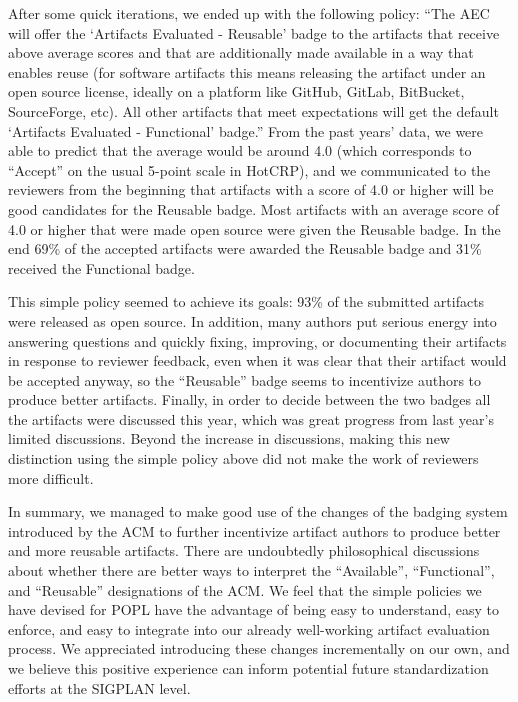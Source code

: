 After some quick iterations, we ended up with the following %
policy: “The AEC will offer the ‘Artifacts Evaluated -
Reusable’ badge to the artifacts that receive above average scores and
that are additionally made available in a way that enables reuse (for
software artifacts this means releasing the artifact under an open
source license, ideally on a platform like GitHub, GitLab, BitBucket,
SourceForge, etc). All other artifacts that meet expectations will get
the default ‘Artifacts Evaluated - Functional’ badge.” From the past
years' data, we were able to predict that the average would be around
4.0 (which corresponds to “Accept” on the usual 5-point scale in
HotCRP), and we communicated to the reviewers from the beginning that
artifacts with a score of 4.0 or higher will be good candidates for
the Reusable badge. %
%
Most artifacts with an average score of 4.0 or higher that were made
open source were given the Reusable badge. In the end 69\% of the
accepted artifacts were awarded the Reusable badge and 31\% received
the Functional badge.

This simple policy seemed to achieve its goals: 93\% of the submitted
artifacts were released as open source. In addition, many authors put
serious energy into answering questions and quickly fixing, improving,
or documenting their artifacts in response to reviewer feedback, even
when it was clear that their artifact would be accepted anyway, so the
“Reusable” badge seems to incentivize authors to produce better
artifacts. Finally, in order to decide between the two badges all the
artifacts were discussed this year, which was great progress from last
year’s limited discussions. Beyond the increase in discussions, making
this new distinction using the simple policy above did not make the
work of reviewers more difficult.


In summary, we managed to make good use of the changes of the badging
system introduced by the ACM to further incentivize artifact authors
to produce better and more reusable artifacts. There are undoubtedly
philosophical discussions about whether there are better ways to
interpret the “Available”, “Functional”, and “Reusable” designations
of the ACM. We feel that the simple policies we have devised for
POPL have the advantage of being easy to understand, easy to enforce,
and easy to integrate into our already well-working artifact
evaluation process. We appreciated introducing these changes
incrementally on our own, and we believe this positive experience can
inform potential future standardization efforts at the SIGPLAN level.

